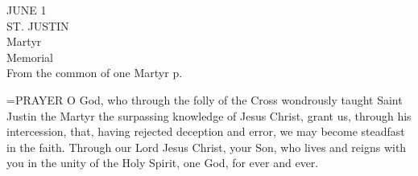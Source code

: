 \begin{center}\normalsize JUNE 1\\
\footnotesize ST. JUSTIN\\
\footnotesize Martyr\\
\footnotesize Memorial\\
\footnotesize From the common of one Martyr p. \\
\end{center}

\hangindent=\parindent \small{PRAYER 
O God, who through the folly of the Cross
wondrously taught Saint Justin the Martyr
the surpassing knowledge of Jesus Christ,
grant us, through his intercession,
that, having rejected deception and error,
we may become steadfast in the faith.
Through our Lord Jesus Christ, your Son,
who lives and reigns with you in the unity of the Holy Spirit,
one God, for ever and ever.\\}
 
